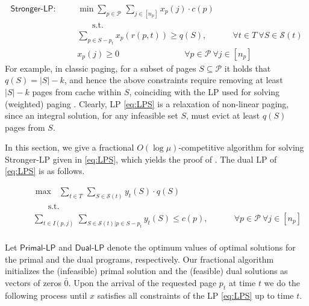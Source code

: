 \documentclass[11pt]{article}
\newcommand{\cC}{{\mathcal{C}}}
\newcommand{\cP}{{\mathcal{P}}}
\newcommand{\cS}{{\mathcal{S}}}
\newcommand{\OPT}{\textnormal{OPT}}
\newcommand{\bbc}{{\bar{\cC}(I_t)}}
\begin{document}
\begin{equation}
	\label{eq:LPS}
	\begin{aligned}
		\textsf{Stronger-LP}:~~~~~~~~	& \min \sum_{p \in \cP~} \sum_{j \in [n_p]}  x_p(j) \cdot c(p)\\
		& ~~~~~~~~\text{s.t. }\\
		& \sum_{p \in S-p_t} x_p(r(p,t)) \geq q(S), 	~~~~~~~~~~~~~~\forall t \in T~\forall S  \in \cS(t) \\ 
		& x_p(j) \geq 0 ~~~~~~~~~~~~~~~~~~~~~~~~~~~~~~~~~~~	\forall p \in \cP~\forall j \in [n_p]
	\end{aligned}
\end{equation} For example, in classic paging, for a subset of pages $S \subseteq \cP$ it holds that $q(S) = |S|-k$, and hence the above constraints require removing at least $|S|-k$ pages from cache within $S$, coinciding with the LP used for solving (weighted) paging \cite{bansal2012primal}. %
Clearly, LP \eqref{eq:LPS} is a relaxation of non-linear paging, since an integral solution, for any infeasible set $S$, must evict at least $q(S)$ pages from $S$. 








In this section, we give a fractional $O\left(\log \mu\right)$-competitive algorithm for solving \textsf{Stronger-LP} given in \eqref{eq:LPS}, which yields the proof of . The dual LP of \eqref{eq:LPS} is as follows. 

\begin{equation}
	\label{eq:dualS}
	\begin{aligned}
		~~~~~~~~	& \max~~~ \sum_{t \in T~} \sum_{S  \in \cS(t)} y_t(S) \cdot q(S)\\
		& ~~~~~~~~\text{s.t. }\\
		& \sum_{t \in I(p,j)~} \sum_{S \in \cS(t)\big|p \in S-p_t} y_t(S) \leq c(p), 	~~~~~~~~~~~~~~\forall p \in \cP~\forall j \in [n_p]\\ 
	\end{aligned}
\end{equation} 


Let $\textsf{Primal-LP}$ and $\textsf{Dual-LP}$  denote the optimum values of optimal solutions for the primal and the dual programs, respectively.  %
Our fractional algorithm initializes the (infeasible) primal solution and the (feasible) dual solutions as vectors of zeros $\bar{0}$. Upon the arrival of the requested page $p_t$ at time $t$ we do the following process until $x$ satisfies all constraints of the LP \eqref{eq:LPS} up to time $t$. 
\end{document}
